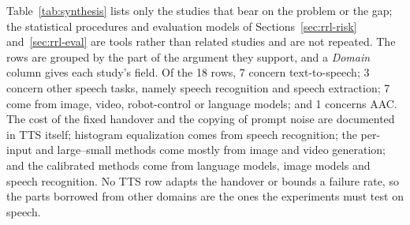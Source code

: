 Table~\ref{tab:synthesis} lists only the studies that bear on the problem or the gap; the statistical procedures and evaluation models of Sections~\ref{sec:rrl-risk} and~\ref{sec:rrl-eval} are tools rather than related studies and are not repeated. The rows are grouped by the part of the argument they support, and a \emph{Domain} column gives each study's field. Of the 18 rows, 7 concern text-to-speech; 3 concern other speech tasks, namely speech recognition and speech extraction; 7 come from image, video, robot-control or language models; and 1 concerns AAC. The cost of the fixed handover and the copying of prompt noise are documented in TTS itself; histogram equalization comes from speech recognition; the per-input and large--small methods come mostly from image and video generation; and the calibrated methods come from language models, image models and speech recognition. No TTS row adapts the handover or bounds a failure rate, so the parts borrowed from other domains are the ones the experiments must test on speech.


